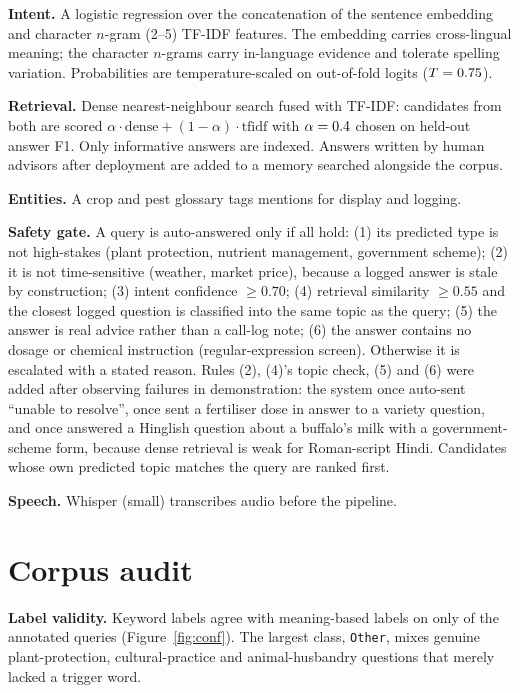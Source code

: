 \documentclass[11pt]{article}
\begin{document}
\textbf{Intent.} A logistic regression over the concatenation of the sentence embedding and character $n$-gram (2--5) TF-IDF features. The embedding carries cross-lingual meaning; the character $n$-grams carry in-language evidence and tolerate spelling variation. Probabilities are temperature-scaled on out-of-fold logits \cite{guo} ($T=0.75{}$).

\textbf{Retrieval.} Dense nearest-neighbour search \cite{faiss} fused with TF-IDF: candidates from both are scored $\alpha\cdot\text{dense}+(1-\alpha)\cdot\text{tfidf}$ with $\alpha=0.4{}$ chosen on held-out answer F1. Only informative answers are indexed. Answers written by human advisors after deployment are added to a memory searched alongside the corpus.

\textbf{Entities.} A crop and pest glossary tags mentions for display and logging.

\textbf{Safety gate.} A query is auto-answered only if all hold: (1) its predicted type is not high-stakes (plant protection, nutrient management, government scheme); (2) it is not time-sensitive (weather, market price), because a logged answer is stale by construction; (3) intent confidence $\ge 0.70$; (4) retrieval similarity $\ge 0.55$ and the closest logged question is classified into the same topic as the query; (5) the answer is real advice rather than a call-log note; (6) the answer contains no dosage or chemical instruction (regular-expression screen). Otherwise it is escalated with a stated reason. Rules (2), (4)'s topic check, (5) and (6) were added after observing failures in demonstration: the system once auto-sent ``unable to resolve'', once sent a fertiliser dose in answer to a variety question, and once answered a Hinglish question about a buffalo's milk with a government-scheme form, because dense retrieval is weak for Roman-script Hindi. Candidates whose own predicted topic matches the query are ranked first.

\textbf{Speech.} Whisper \cite{whisper} (small) transcribes audio before the pipeline.

\section{Corpus audit}
\label{sec:audit}
\textbf{Label validity.} Keyword labels agree with meaning-based labels on only \kwAgree{} of the \annN{} annotated queries (Figure~\ref{fig:conf}). The largest class, \texttt{Other}, mixes genuine plant-protection, cultural-practice and animal-husbandry questions that merely lacked a trigger word.
\end{document}
